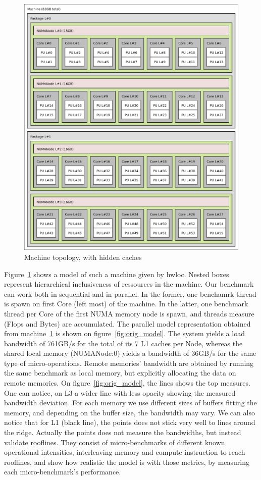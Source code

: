 \documentclass[twoside,twocolumn,8pt]{extarticle}
\begin{document}
\begin{figure}
  \centering
  \includegraphics[width=\textwidth]{pictures/Xeon_E5_2650L_v4}
  \caption{Machine topology, with hidden caches}
  \label{fig:joe0}
\end{figure}

Figure~\ref{fig:joe0} shows a model of such a machine given by hwloc.
Nested boxes represent hierarchical inclusiveness of ressources in the machine.
Our benchmark can work both in sequential and in parallel.
In the former, one benchamrk thread is spawn on first Core (left most) of the machine.
In the latter, one benchmark thread per Core of the first NUMA memory node is spawn, and threads measure (Flops and Bytes) are
accumulated.
The parallel model representation obtained from machine~\ref{fig:joe0} is shown on figure~\ref{fig:orig_model}.
The system yields a load bandwidth of 761GB/s for the total of its 7 L1 caches per Node, whereas the shared local memory
(NUMANode:0) yields a bandwidth of 36GB/s for the same type of micro-operations.
Remote memories' bandwidth are obtained by running the same benchmark as local memory, but explicitly allocating the data on remote
 memories.
On figure~\ref{fig:orig_model}, the lines shows the top measures.
One can notice, on L3 a wider line with less opacity showing the measured bandwidth deviation.
For each memory we use different sizes of buffers fitting the memory, and depending on the buffer size, the bandwidth may vary.
We can also notice that for L1 (black line), the points does not stick very well to lines around the ridge. Actually the points
does not measure the bandwidths, but instead validate rooflines. They consist of micro-benchmarks of different known operational
intensities, interleaving memory and compute instruction to reach rooflines, and show how realistic the model is with those
metrics, by measuring each micro-benchmark's performance.
\end{document}
